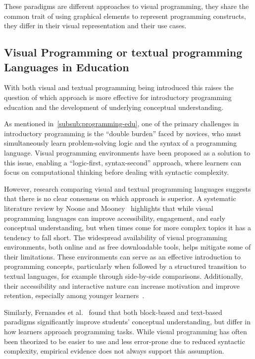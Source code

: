 These paradigms are different approaches to visual programming, they share the common trait of using graphical elements to represent programming constructs, they differ in their visual representation and their use cases.

\subsection{Visual Programming or textual programming Languages in Education}

With both visual and textual programming being introduced this raises the question of which approach is more effective for introductory programming education and the development of underlying conceptual understanding.

As mentioned in~\ref{subsub:programming-edu}, one of the primary challenges in introductory programming is the “double burden” faced by novices, who must simultaneously learn problem-solving logic and the syntax of a programming language.
Visual programming environments have been proposed as a solution to this issue, enabling a “logic-first, syntax-second” approach, where learners can focus on computational thinking before dealing with syntactic complexity.

However, research comparing visual and textual programming languages suggests that there is no clear consensus on which approach is superior.
A systematic literature review by Noone and Mooney~\cite{noone_visual_2018} highlights that while visual programming languages can improve accessibility, engagement, and early conceptual understanding, but when times come for more complex topics it has a tendency to fall short.
The widespread availability of visual programming environments, both online and as free downloadable tools, helps mitigate some of their limitations.
These environments can serve as an effective introduction to programming concepts, particularly when followed by a structured transition to textual languages, for example through side-by-side comparisons.
Additionally, their accessibility and interactive nature can increase motivation and improve retention, especially among younger learners~\cite{noone_visual_2018}.

Similarly, Fernandes et al.~\cite{fernandes_blocks_2026} found that both block-based and text-based paradigms significantly improve students' conceptual understanding, but differ in how learners approach programming tasks.
While visual programming has often been theorized to be easier to use and less error-prone due to reduced syntactic complexity, empirical evidence does not always support this assumption.

